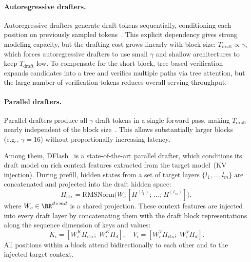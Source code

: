 \paragraph{Autoregressive drafters.}
Autoregressive drafters generate draft tokens sequentially, conditioning each position on previously sampled tokens~\citep{liu2024deepseek,pmlr-v235-li24bt,li-etal-2024-eagle,li2026eagle,zhang2025learningharmonizedrepresentationsspeculative}.
This explicit dependency gives strong modeling capacity, but the drafting cost grows linearly with block size: $T_{\text{draft}} \propto \gamma$, which forces autoregressive drafters to use small $\gamma$ and shallow architectures to keep $T_{\text{draft}}$ low.
To compensate for the short block, tree-based verification~\citep{miao2024specinfer} expands candidates into a tree and verifies multiple paths via tree attention, but the large number of verification tokens reduces overall serving throughput.

\paragraph{Parallel drafters.}
Parallel drafters produce all $\gamma$ draft tokens in a single forward pass, making $T_{\text{draft}}$ nearly independent of the block size~\citep{pmlr-v235-cai24b,chen2026dflash,liu2026dartdiffusioninspiredspeculativedecoding,li2025diffuspecunlockingdiffusionlanguage,sandler2025specdiff2scalingdiffusiondrafter}.
This allows substantially larger blocks (e.g., $\gamma{=}16$) without proportionally increasing latency.

Among them, DFlash~\citep{chen2026dflash} is a state-of-the-art parallel drafter, which conditions its draft model on rich context features extracted from the target model~(KV injection).
During prefill, hidden states from a set of target layers $\{l_1, \ldots, l_m\}$ are concatenated and projected into the draft hidden space:
\begin{equation}
H_{\text{ctx}} = \mathrm{RMSNorm}\bigl(W_c\,[H^{(l_1)};\, \ldots;\, H^{(l_m)}]\bigr),
\label{eq:ctx_feature}
\end{equation}
where $W_c \in \RR^{d \times md}$ is a shared projection.
These context features are injected into every draft layer by concatenating them with the draft block representations along the sequence dimension of keys and values:
\begin{equation}
K_i = [W_i^K H_{\text{ctx}};\; W_i^K H_d], \quad V_i = [W_i^V H_{\text{ctx}};\; W_i^V H_d].
\label{eq:kv_injection}
\end{equation}
All positions within a block attend bidirectionally to each other and to the injected target context.

